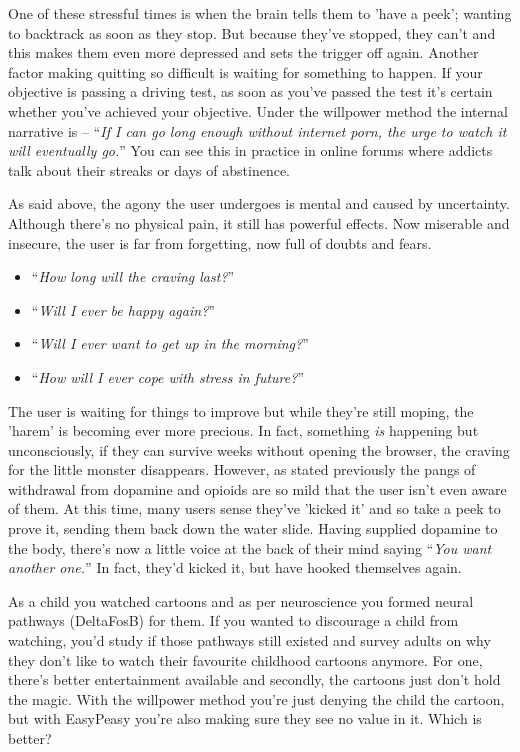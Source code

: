 \documentclass[
]{book}
\begin{document}
One of these stressful times is when the brain tells them to 'have a peek'; wanting to backtrack as soon as they stop. But because they've stopped, they can't and this makes them even more depressed and sets the trigger off again. Another factor making quitting so difficult is waiting for something to happen. If your objective is passing a driving test, as soon as you've passed the test it's certain whether you've achieved your objective. Under the willpower method the internal narrative is -- ``\emph{If I can go long enough without internet porn, the urge to watch it will eventually go.}'' You can see this in practice in online forums where addicts talk about their streaks or days of abstinence.

As said above, the agony the user undergoes is mental and caused by uncertainty. Although there's no physical pain, it still has powerful effects. Now miserable and insecure, the user is far from forgetting, now full of doubts and fears.

\begin{itemize}
\item
  ``\emph{How long will the craving last?}''
\item
  ``\emph{Will I ever be happy again?}''
\item
  ``\emph{Will I ever want to get up in the morning?}''
\item
  ``\emph{How will I ever cope with stress in future?}''
\end{itemize}

The user is waiting for things to improve but while they're still moping, the 'harem' is becoming ever more precious. In fact, something \emph{is} happening but unconsciously, if they can survive weeks without opening the browser, the craving for the little monster disappears. However, as stated previously the pangs of withdrawal from dopamine and opioids are so mild that the user isn't even aware of them. At this time, many users sense they've 'kicked it' and so take a peek to prove it, sending them back down the water slide. Having supplied dopamine to the body, there's now a little voice at the back of their mind saying ``\emph{You want another one.}'' In fact, they'd kicked it, but have hooked themselves again.

As a child you watched cartoons and as per neuroscience you formed neural pathways (DeltaFosB) for them. If you wanted to discourage a child from watching, you'd study if those pathways still existed and survey adults on why they don't like to watch their favourite childhood cartoons anymore. For one, there's better entertainment available and secondly, the cartoons just don't hold the magic. With the willpower method you're just denying the child the cartoon, but with EasyPeasy you're also making sure they see no value in it. Which is better?
\end{document}
